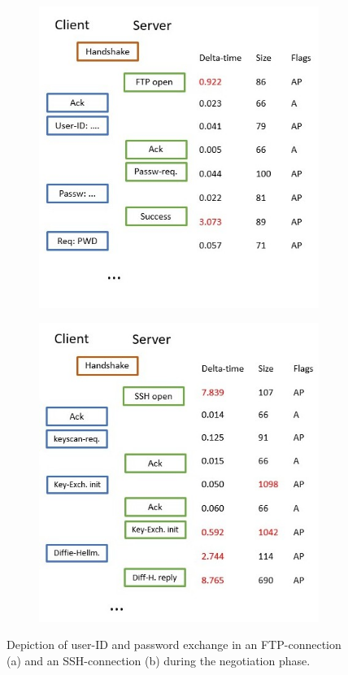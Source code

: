 \documentclass[a4paper,12pt,twoside]{report}
\begin{document}
\begin{figure}\label{negot}
\centering
\begin{subfigure}[b]{0.49\textwidth}\label{FTP}
\includegraphics[width=\textwidth]{images/FTP.jpg}
\caption{}
\end{subfigure}
\begin{subfigure}[b]{0.49\textwidth}\label{SSH}
\includegraphics[width=\textwidth]{images/SSH.jpg}
\caption{}
\end{subfigure}
\caption{Depiction of user-ID and password exchange in an FTP-connection (a) and an SSH-connection (b) during the negotiation phase.}
\end{figure}
\end{document}
